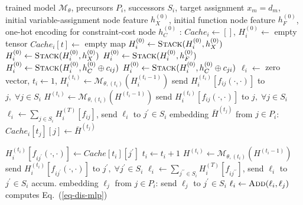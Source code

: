 \documentclass[letterpaper]{article} %
\begin{document}
\algrenewcommand{}
\begin{algorithm}[!t]
\small
\caption{Distributed embedding schema for agent $i$}\label{algo:train_d}
\begin{algorithmic}[1]
\Require trained model $\mathcal{M}_\theta$, precursors $P_i$, successors $S_i$, target assignment $x_m=d_m$, initial variable-assignment node feature $h_X^{(0)}$, initial function node feature $h_F^{(0)}$, one-hot encoding for constraint-cost node $h_C^{(0)}$
:
\State $Cache_i\gets []$, $H_i^{(0)}\gets $ empty tensor
$Cache_i[t]\gets $ empty map
\EndFor
{}
$H_i^{(0)}\gets \textsc{Stack}(H_i^{(0)},h_X^{(0)})$
\Else
{}
$H_i^{(0)}\gets \textsc{Stack}(H_i^{(0)},h_X^{(0)})$
\EndFor
\EndIf
{}
\State $H_i^{(0)}\gets \textsc{Stack}(H_i^{(0)},h_F^{(0)})$
\State $H_i^{(0)}\gets \textsc{Stack}(H_i^{(0)},h_C^{(0)}\oplus c_{ij})$
\EndFor
\EndFor
{}
\State $H_i^{(0)}\gets \textsc{Stack}(H_i^{(0)},h_C^{(0)}\oplus c_{ji})$
\EndFor
\EndFor
\State $\ell_i\gets $ zero vector, $t_i\gets 1$, $H_i^{(t_i)}\gets \mathcal{M}_{\theta, (t_i)}(H_i^{(t_i-1)})$
\State send $H^{(t_i)}_{i}[f_{ij}(\cdot,\cdot)]$ to $j,\; \forall j\in S_i$
\State $H^{(t_i)}\gets \mathcal{M}_{\theta, (t_i)}(H^{(t_i-1)})$
\State send $H^{(t_i)}_{i}[f_{ij}(\cdot,\cdot)]$ to $j,\; \forall j\in S_i$
\EndIf
\EndFor
\State $\ell_i\gets\sum_{j\in S_i}H^{(T)}_i[f_{ij}]$, send $\ell_i$ to $j^\prime\in S_i$
\EndIf
\EndProcedure
{} embedding $\bar{H}^{(t_j)}$ from $j\in P_i$:
\State $Cache_i[t_j][j]\gets \bar{H}^{(t_j)}$

\State $H_{i}^{(t_i)}[f_{ij^\prime}(\cdot,\cdot)]\gets Cache[t_i][{j^\prime}]$
\EndFor
\State $t_i\gets t_i+1$
\State $H^{(t_i)}\gets \mathcal{M}_{\theta, (t_i)}(H^{(t_i-1)})$
\State send $H^{(t_i)}_{i}[f_{ij^\prime}(\cdot,\cdot)]$ to $j^\prime,\; \forall j^\prime\in S_i$
\Else
\State $\ell_i\gets\sum_{j^{\prime\prime}\in S_i}H^{(T)}_i[f_{ij^{\prime\prime}}]$, send $\ell_i$ to $j^\prime\in S_i$
\EndIf
\EndIf
\EndProcedure
{} accum. embedding $\ell_j$ from $j\in P_i$:
\State send $\ell_j$ to ${j^\prime}\in S_i$
\Else
\State $\ell_i\gets \textsc{Add}(\ell_i,\ell_j)$
\State computes Eq.~(\ref{eq-dis-mlp})
\EndIf
\EndIf
\EndProcedure
\end{algorithmic}
\end{algorithm}
\end{document}

